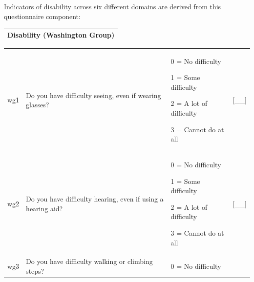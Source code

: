 \documentclass[12pt,a4paper]{book}
\theoremstyle{definition}
\theoremstyle{definition}
\theoremstyle{definition}
\theoremstyle{remark}
\begin{document}
Indicators of disability across six different domains are derived from
this questionnaire component:

\begin{longtable}[]{@{}c@{}}
\toprule
\begin{minipage}[t]{0.97\columnwidth}\centering
\textbf{Disability (Washington Group)}\strut
\end{minipage}\tabularnewline
\bottomrule
\end{longtable}

\begin{longtable}[]{@{}llll@{}}
\toprule
\begin{minipage}[t]{0.24\columnwidth}\raggedright
wg1\strut
\end{minipage} & \begin{minipage}[t]{0.24\columnwidth}\raggedright
Do you have difficulty seeing, even if wearing glasses?\strut
\end{minipage} & \begin{minipage}[t]{0.24\columnwidth}\raggedright
0 = No difficulty

1 = Some difficulty

2 = A lot of difficulty

3 = Cannot do at all\strut
\end{minipage} & \begin{minipage}[t]{0.24\columnwidth}\raggedright
{[}\_\_{]}\strut
\end{minipage}\tabularnewline
\begin{minipage}[t]{0.24\columnwidth}\raggedright
wg2\strut
\end{minipage} & \begin{minipage}[t]{0.24\columnwidth}\raggedright
Do you have difficulty hearing, even if using a hearing aid?\strut
\end{minipage} & \begin{minipage}[t]{0.24\columnwidth}\raggedright
0 = No difficulty

1 = Some difficulty

2 = A lot of difficulty

3 = Cannot do at all\strut
\end{minipage} & \begin{minipage}[t]{0.24\columnwidth}\raggedright
{[}\_\_{]}\strut
\end{minipage}\tabularnewline
\begin{minipage}[t]{0.24\columnwidth}\raggedright
wg3\strut
\end{minipage} & \begin{minipage}[t]{0.24\columnwidth}\raggedright
Do you have difficulty walking or climbing steps?\strut
\end{minipage} & \begin{minipage}[t]{0.24\columnwidth}\raggedright
0 = No difficulty


\end{minipage}
\end{longtable}
\end{document}
